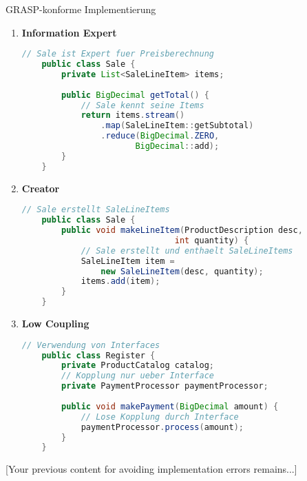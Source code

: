 \begin{KR}{GRASP-konforme Implementierung}
\begin{enumerate}
    \item \textbf{Information Expert}
    \begin{lstlisting}[language=Java]
    // Sale ist Expert fuer Preisberechnung
    public class Sale {
        private List<SaleLineItem> items;
        
        public BigDecimal getTotal() {
            // Sale kennt seine Items
            return items.stream()
                .map(SaleLineItem::getSubtotal)
                .reduce(BigDecimal.ZERO, 
                       BigDecimal::add);
        }
    }
    \end{lstlisting}

    \item \textbf{Creator}
    \begin{lstlisting}[language=Java]
    // Sale erstellt SaleLineItems
    public class Sale {
        public void makeLineItem(ProductDescription desc, 
                               int quantity) {
            // Sale erstellt und enthaelt SaleLineItems
            SaleLineItem item = 
                new SaleLineItem(desc, quantity);
            items.add(item);
        }
    }
    \end{lstlisting}

    \item \textbf{Low Coupling}
    \begin{lstlisting}[language=Java]
    // Verwendung von Interfaces
    public class Register {
        private ProductCatalog catalog;
        // Kopplung nur ueber Interface
        private PaymentProcessor paymentProcessor;
        
        public void makePayment(BigDecimal amount) {
            // Lose Kopplung durch Interface
            paymentProcessor.process(amount);
        }
    }
    \end{lstlisting}
\end{enumerate}
\end{KR}

[Your previous content for avoiding implementation errors remains...]